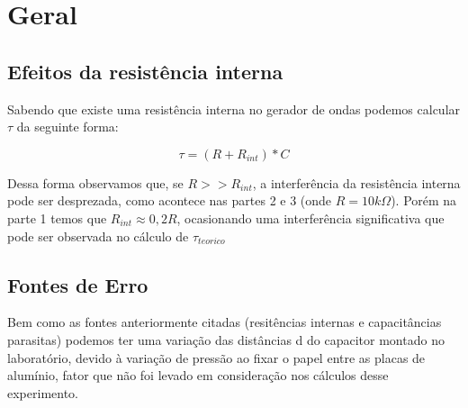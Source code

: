 \section{Geral}

    \subsection{Efeitos da resistência interna}
        
        Sabendo que existe uma resistência interna no gerador de ondas
        podemos calcular $\tau$ da seguinte forma:

        $$\tau = (R+R_{int})*C$$

        Dessa forma observamos que, se $R >> R_{int}$, a interferência da 
        resistência interna pode ser desprezada, como acontece nas partes
        2 e 3 (onde $R = 10 k\Omega$). Porém na parte 1 temos que 
        $R_{int} \approx 0,2R$, ocasionando uma interferência significativa
        que pode ser observada no cálculo de $\tau_{teorico}$

    \subsection{Fontes de Erro}

        Bem como as fontes anteriormente citadas (resitências internas
        e capacitâncias parasitas) podemos ter uma variação das distâncias d
        do capacitor montado no laboratório, devido à variação de pressão
        ao fixar o papel entre as placas de alumínio, fator que não foi levado
        em consideração nos cálculos desse experimento.